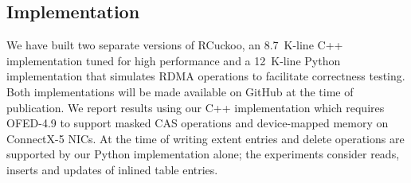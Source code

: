 \subsection{Implementation}

We have built two separate versions of RCuckoo, an 8.7~K-line C++
implementation tuned for high performance and a 12~K-line Python
implementation that simulates RDMA operations to facilitate
correctness testing. Both implementations will be made available on
GitHub at the time of publication.  We report results using our C++
implementation which requires OFED-4.9 to support masked CAS
operations and device-mapped memory on ConnectX-5 NICs.  At the time
of writing extent entries and delete operations are supported by our
Python implementation alone; the experiments consider reads, inserts
and updates of inlined table entries.
